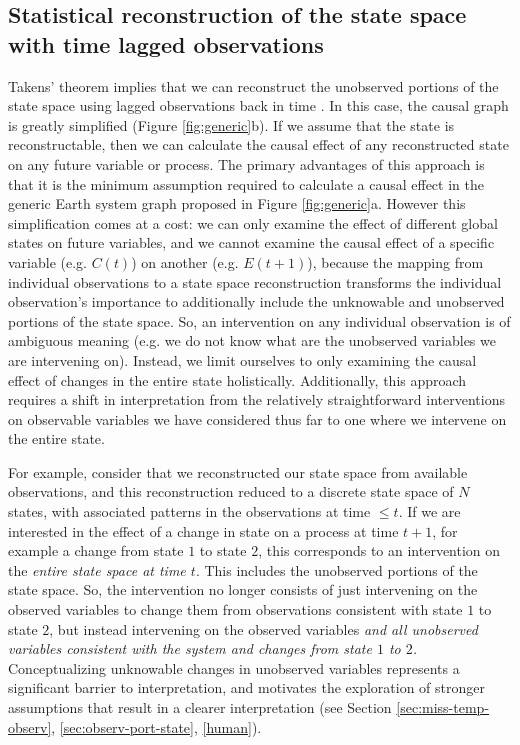 \documentclass[12pt]{article}
\begin{document}
\subsection{Statistical reconstruction of the state space with time
  lagged observations}
\label{sec:stat-reconstr-state}

Takens' theorem implies that we can reconstruct the unobserved
portions of the state space using lagged observations back in time
\citep{takens1981detecting,deyle2011generalized,Sugihara496}. In this
case, the causal graph is greatly simplified (Figure
\ref{fig:generic}b). If we assume that the state is reconstructable,
then we can calculate the causal effect of any reconstructed state on
any future variable or process. The primary advantages of this
approach is that it is the minimum assumption required to calculate a
causal effect in the generic Earth system graph proposed in Figure
\ref{fig:generic}a. However this simplification comes at a cost: we
can only examine the effect of different global states on future
variables, and we cannot examine the causal effect of a specific
variable (e.g. $C(t)$) on another (e.g. $E(t+1)$), because the mapping
from individual observations to a state space reconstruction
transforms the individual observation's importance to additionally
include the unknowable and unobserved portions of the state space. So,
an intervention on any individual observation is of ambiguous meaning
(e.g. we do not know what are the unobserved variables we are
intervening on). Instead, we limit ourselves to only examining the
causal effect of changes in the entire state
holistically. Additionally, this approach requires a shift in
interpretation from the relatively straightforward interventions on
observable variables we have considered thus far to one where we
intervene on the entire state.

For example, consider that we reconstructed our state space from
available observations, and this reconstruction reduced to a discrete
state space of $N$ states, with associated patterns in the observations
at time $\leq t$. If we are interested in the effect of a change in
state on a process at time $t+1$, for example a change from state $1$
to state $2$, this corresponds to an intervention on the
\textit{entire state space at time $t$}. This includes the unobserved
portions of the state space. So, the intervention no longer consists
of just intervening on the observed variables to change them from
observations consistent with state $1$ to state $2$, but instead
intervening on the observed variables \emph{and all unobserved
  variables consistent with the system and changes from state $1$ to
  $2$.}  Conceptualizing unknowable changes in unobserved variables
represents a significant barrier to interpretation, and motivates the
exploration of stronger assumptions that result in a clearer
interpretation (see Section \ref{sec:miss-temp-observ},
\ref{sec:observ-port-state}, \ref{human}).
\end{document}
